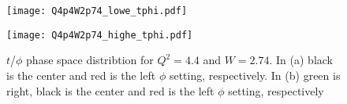 \begin{figure}
  \centering
  \begin{minipage}[b]{0.48\linewidth}
    \texttt{[image: Q4p4W2p74\_lowe\_tphi.pdf]}
  \end{minipage}
  \begin{minipage}[b]{0.48\linewidth}
    \texttt{[image: Q4p4W2p74\_highe\_tphi.pdf]}
  \end{minipage}  
  \caption{$t$/$\phi$ phase space distribtion for $Q^2=4.4$ and $W=2.74$. In (a) black is the center and red is the left $\phi$ setting, respectively. In (b) green is right, black is the center and red is the left $\phi$ setting, respectively}
  \label{fig:Q4p4W2p74_tphi}
\end{figure}

